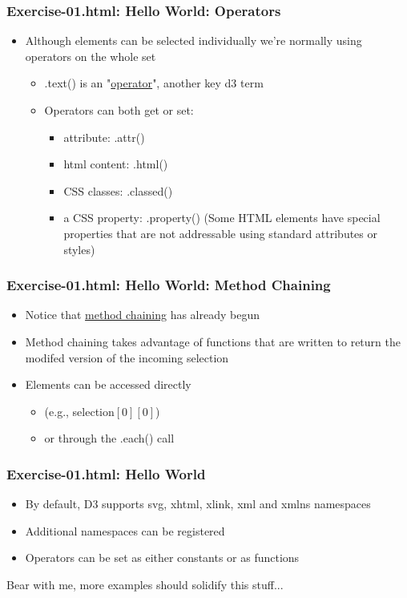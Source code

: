 \documentclass{beamer}
\begin{document}
\begin{frame}
    \frametitle{Exercise-01.html: Hello World: Operators}
    \begin{itemize}
    \item Although elements can be selected individually we're normally using operators on the whole set
        \begin{itemize}
        \item .text() is an "\underline{operator}", another key d3 term
        \item Operators can both get or set:
            \begin{itemize}
            \item attribute: .attr()
            \item html content: .html()
            \item CSS classes: .classed() 
            \item a CSS property: .property() (Some HTML elements have special properties that are not addressable using standard attributes or styles)
            \end{itemize}
        \end{itemize}
    \end{itemize}
\end{frame}



\begin{frame}
    \frametitle{Exercise-01.html: Hello World: Method Chaining}
    \begin{itemize}
    \item Notice that \underline{method chaining} has already begun
    \item Method chaining takes advantage of functions that are written to return the modifed version of the incoming selection
    \item Elements can be accessed directly
        \begin{itemize}
        \item (e.g., selection$[0][0]$)
        \item or through the .each() call
        \end{itemize}
    \end{itemize}
\end{frame}



\begin{frame}
    \frametitle{Exercise-01.html: Hello World}
    \begin{itemize}
    \item By default, D3 supports svg, xhtml, xlink, xml and xmlns namespaces
    \item Additional namespaces can be registered
    \item Operators can be set as either constants or as functions
    \end{itemize}
Bear with me, more examples should solidify this stuff...
\end{frame}
\end{document}
